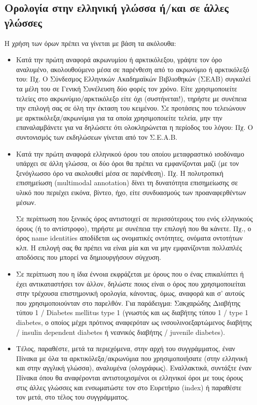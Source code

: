 \subsection{Ορολογία στην ελληνική γλώσσα ή/και σε άλλες γλώσσες}
Η χρήση των όρων πρέπει να γίνεται με βάση τα ακόλουθα:
\begin{itemize}
\item Κατά την πρώτη αναφορά ακρωνυμίου ή αρκτικόλεξου, γράψτε τον όρο αναλυμένο,
ακολουθούμενο μέσα σε παρένθεση από το ακρωνύμιο ή αρκτικόλεξό του:
Πχ. Ο Σύνδεσμος Ελληνικών Ακαδημαϊκών Βιβλιοθηκών (ΣΕΑΒ) συγκαλεί τα μέλη
του σε Γενική Συνέλευση δύο φορές τον χρόνο.
Είτε χρησιμοποιείτε τελείες στο ακρωνύμιο/αρκτικόλεξο είτε όχι (συστήνεται!),
τηρήστε με συνέπεια την επιλογή σας σε όλη την έκταση του κειμένου.
Σε προτάσεις που τελειώνουν με αρκτικόλεξα/ακρωνύμια για τα οποία χρησιμοποιείτε
τελεία, μην την επαναλαμβάνετε για να δηλώσετε ότι ολοκληρώνεται η περίοδος του λόγου:
Πχ. Ο συντονισμός των εκδηλώσεων γίνεται από τον Σ.Ε.Α.Β.
\item Κατά την πρώτη αναφορά ελληνικού όρου του οποίου μεταφραστικό ισοδύναμο υπάρχει
σε άλλη γλώσ\-σα, οι δύο όροι θα πρέπει να εμφανίζονται μαζί (με τον ξενόγλωσσο όρο
να ακολουθεί μέσα σε παρένθεση). Πχ. Η πολυτροπική επισημείωση (multimodal annotation) δίνει τη δυνατότητα
επισημείωσης σε υλικό που περιέχει εικόνα, βίντεο, ήχο, είτε συνδυασμούς των
προαναφερθέντων μέσων.

Σε περίπτωση που ξενικός όρος αντιστοιχεί σε περισσότερους του ενός ελληνικούς όρους
(ή το αντίστροφο), τηρήστε με συνέπεια την επιλογή που θα κάνετε. Πχ., ο όρος name
identities αποδίδεται ως ονοματικές οντότητες, ονόματα οντοτήτων κλπ. Η επιλογή σας θα
πρέπει να είναι μία και να μην εμφανίζονται πολλαπλές αποδόσεις που μπορεί να
δημιουργήσουν σύγχυση.
\item Σε περίπτωση που η ίδια έννοια εκφράζεται με όρους που ο ένας επικαλύπτει ή έχει
αντικαταστήσει τον άλλον, δηλώστε ποιος είναι ο όρος που χρησιμοποιείται στην
τρέχουσα επιστημονική ορολογία, κάνοντας, όμως, αναφορά και σ’ αυτούς που
χρησιμοποιούνταν στο παρελθόν. Για παράδειγμα: Σακχαρώδης Διαβήτης τύπου 1 /
Diabetes mellitus type 1 (γνωστός και ως διαβήτης τύπου 1 / type 1 diabetes, ο οποίος μέχρι
πρότινος αναφερόταν ως ινσουλινοεξαρτώμενος διαβήτης / insulin dependent diabetes ή
νεανικός διαβήτης / juvenile diabetes).
\item Τέλος, παραθέστε, μετά τα περιεχόμενα, στην αρχή του συγγράμματος, έναν Πίνακα με
όλα τα αρκτικόλεξα/ακρωνύμια που χρησιμοποιήσατε (στην ελληνική και στην αγγλική
γλώσσα), αναλυμένα (ολογράφως). Εναλλακτικά, συντάξτε έναν Πίνακα όπου θα
αναφέρονται αντιστοιχισμένοι οι ελληνικοί όροι με τους όρους στις άλλες γλώσσες και
ενσωματώστε τον στο Ευρετήριο (index) ή παραθέστε τον μετά, στο τέλος του
συγγράμματος.
\end{itemize}
